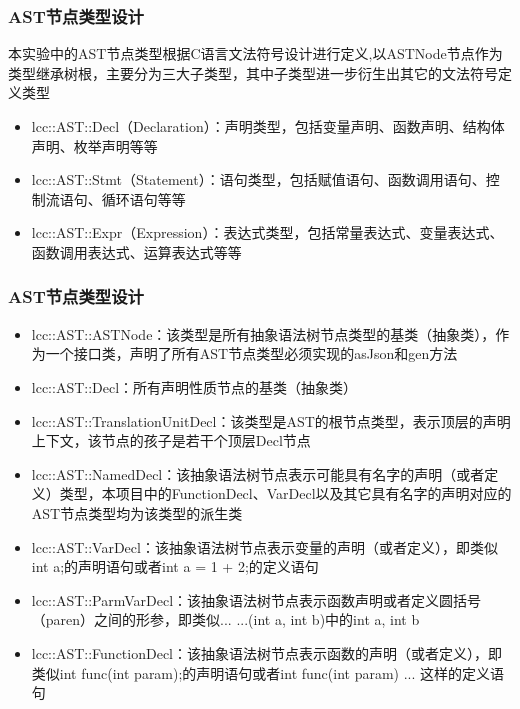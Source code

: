 \begin{frame}
    \frametitle{AST节点类型设计}
    \footnotesize
    {本实验中的AST节点类型根据C语言文法符号设计进行定义,以ASTNode节点作为类型继承树根，主要分为三大子类型，其中子类型进一步衍生出其它的文法符号定义类型}
    \begin{itemize}
        \item {lcc::AST::Decl（Declaration）：声明类型，包括变量声明、函数声明、结构体声明、枚举声明等等}
        \item {lcc::AST::Stmt（Statement）：语句类型，包括赋值语句、函数调用语句、控制流语句、循环语句等等}
        \item {lcc::AST::Expr（Expression）：表达式类型，包括常量表达式、变量表达式、函数调用表达式、运算表达式等等}
    \end{itemize}
\end{frame}

\begin{frame}
    \frametitle{AST节点类型设计}
    \footnotesize
    \begin{itemize}
        \item {lcc::AST::ASTNode：该类型是所有抽象语法树节点类型的基类（抽象类），作为一个接口类，声明了所有AST节点类型必须实现的asJson和gen方法}
        \item {lcc::AST::Decl：所有声明性质节点的基类（抽象类）}
        \item {lcc::AST::TranslationUnitDecl：该类型是AST的根节点类型，表示顶层的声明上下文，该节点的孩子是若干个顶层Decl节点}
        \item {lcc::AST::NamedDecl：该抽象语法树节点表示可能具有名字的声明（或者定义）类型，本项目中的FunctionDecl、VarDecl以及其它具有名字的声明对应的AST节点类型均为该类型的派生类}
        \item {lcc::AST::VarDecl：该抽象语法树节点表示变量的声明（或者定义），即类似int a;的声明语句或者int a = 1 + 2;的定义语句}
        \item {lcc::AST::ParmVarDecl：该抽象语法树节点表示函数声明或者定义圆括号（paren）之间的形参，即类似... ...(int a, int b)中的int a, int b}
        \item {lcc::AST::FunctionDecl：该抽象语法树节点表示函数的声明（或者定义），即类似int func(int param);的声明语句或者int func(int param){ ... }这样的定义语句}
    \end{itemize}
\end{frame}

